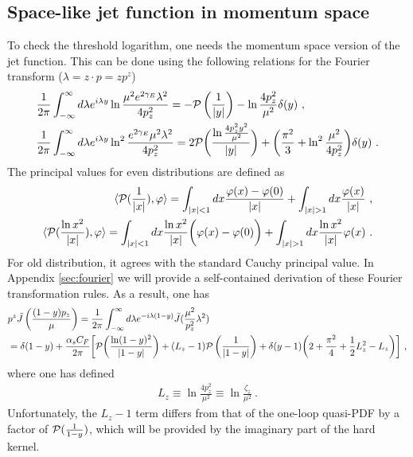 \documentclass[a4paper,11pt]{article}
\begin{document}
\subsection{Space-like jet function in momentum space}
To check the threshold logarithm, one needs the momentum space version of the jet function. This can be done using the following relations for the Fourier transform ($\lambda=z\cdot p=zp^z$)
\begin{align}\label{eq:defprin}
&\frac{1}{2\pi}\int_{-\infty}^{\infty} d\lambda e^{i\lambda y}\ln \frac{\mu^2e^{2\gamma_E}\lambda^2}{4p_z^2}=-{\cal P}\left(\frac{1}{|y|}\right)-\ln \frac{4p_z^2}{\mu^2}\delta(y) \ , \\ 
&\frac{1}{2\pi}\int_{-\infty}^{\infty} d\lambda e^{i\lambda y}\ln^2 \frac{e^{2\gamma_E}\mu^2\lambda^2}{4p_z^2}=2{\cal P}\bigg(\frac{\ln \frac{4p_z^2y^2}{\mu^2}}{|y|}\bigg)+\bigg(\frac{\pi^2}{3}+\ln^2 \frac{\mu^2}{4p_z^2}\bigg)\delta(y) \ .
\end{align}
The principal values for even distributions are defined as
\begin{align}\label{eq: defprin}
   \langle  {\cal P}(\frac{1}{|x|}),\varphi \rangle = \int_{|x|<1} dx \frac{\varphi(x)-\varphi(0)}{|x|}+ \int_{|x|>1} dx \frac{\varphi(x)}{|x|} \ , \\ 
   \langle  {\cal P}(\frac{\ln x^2}{|x|}),\varphi \rangle = \int_{|x|<1} dx \frac{\ln x^2}{|x|}\bigg(\varphi(x)-\varphi(0)\bigg) +\int_{|x|>1} dx \frac{\ln x^2 }{|x|} \varphi(x) \ .
   \end{align}
For old distribution, it agrees with the standard Cauchy principal value. In Appendix \ref{sec:fourier} we will provide a self-contained derivation of these Fourier transformation rules. As a result, one has
\begin{align}\label{eq: jetbare}
&p^z\tilde J\left(\frac{(1-y)p_z}{\mu}\right)=\frac{1}{2\pi}\int_{-\infty}^{\infty} d\lambda e^{-i\lambda (1-y)} \tilde J(\frac{\mu^2}{p_z^2}\lambda^2)\nonumber \\ 
&=\delta(1-y)+\frac{\alpha_sC_F}{2\pi}\bigg[{\cal P}\bigg(\frac{\ln (1-y)^2}{|1-y|}\bigg)+(L_z-1){\cal P}\left(\frac{1}{|1-y|}\right)+\delta(y-1)\bigg(2+\frac{\pi^2}{4}+\frac{1}{2}L_z^2-L_z\bigg)\bigg] \ ,
\end{align}
where one has defined
\begin{align}\label{eq:defLz}
L_z \equiv \ln \frac{4p_z^2}{\mu^2} \equiv \ln \frac{\zeta_z}{\mu^2} \ .
\end{align}
Unfortunately, the $L_z-1$ term differs from that of the one-loop quasi-PDF by a factor of ${\cal P}(\frac{1}{1-y})$, which will be provided by the imaginary part of the hard kernel. 
\end{document}
